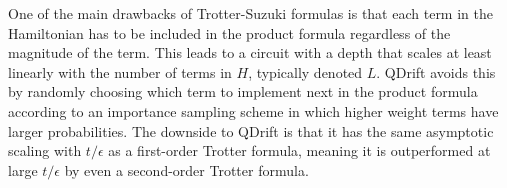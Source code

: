 One of the main drawbacks of Trotter-Suzuki formulas is that each term in the Hamiltonian has to be included in the product formula regardless of the magnitude of the term.  This leads
to a circuit with a depth that scales at least linearly with the number of terms in $H$, typically denoted $L$. QDrift avoids this by randomly choosing which
term to implement next in the product formula according to an importance sampling scheme in which higher weight terms have larger probabilities. The
downside to QDrift is that it has the same asymptotic scaling with $t/\epsilon$ as a first-order Trotter formula, meaning it is outperformed at large
$t/\epsilon$ by even a second-order Trotter formula. 


